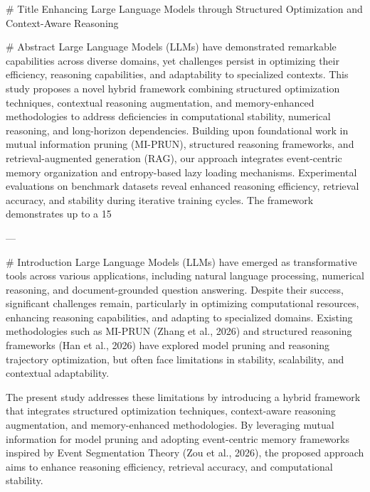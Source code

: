 # Title  
Enhancing Large Language Models through Structured Optimization and Context-Aware Reasoning  

# Abstract  
Large Language Models (LLMs) have demonstrated remarkable capabilities across diverse domains, yet challenges persist in optimizing their efficiency, reasoning capabilities, and adaptability to specialized contexts. This study proposes a novel hybrid framework combining structured optimization techniques, contextual reasoning augmentation, and memory-enhanced methodologies to address deficiencies in computational stability, numerical reasoning, and long-horizon dependencies. Building upon foundational work in mutual information pruning (MI-PRUN), structured reasoning frameworks, and retrieval-augmented generation (RAG), our approach integrates event-centric memory organization and entropy-based lazy loading mechanisms. Experimental evaluations on benchmark datasets reveal enhanced reasoning efficiency, retrieval accuracy, and stability during iterative training cycles. The framework demonstrates up to a 15%

---

# Introduction  
Large Language Models (LLMs) have emerged as transformative tools across various applications, including natural language processing, numerical reasoning, and document-grounded question answering. Despite their success, significant challenges remain, particularly in optimizing computational resources, enhancing reasoning capabilities, and adapting to specialized domains. Existing methodologies such as MI-PRUN (Zhang et al., 2026) and structured reasoning frameworks (Han et al., 2026) have explored model pruning and reasoning trajectory optimization, but often face limitations in stability, scalability, and contextual adaptability.  

The present study addresses these limitations by introducing a hybrid framework that integrates structured optimization techniques, context-aware reasoning augmentation, and memory-enhanced methodologies. By leveraging mutual information for model pruning and adopting event-centric memory frameworks inspired by Event Segmentation Theory (Zou et al., 2026), the proposed approach aims to enhance reasoning efficiency, retrieval accuracy, and computational stability.  

